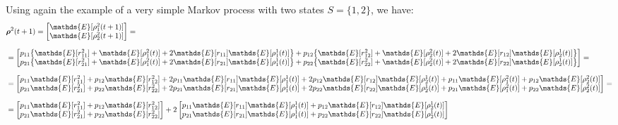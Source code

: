 \documentclass[\main/main.tex]{subfiles}
\begin{document}
Using again the example of a very simple Markov process with two states $S=\{1,2\}$, we have:
\begin{equation}
\setlength{\jot}{10pt}
\begin{split}
    &\bm{\rho}^2(t+1) =    
\begin{bmatrix}
      \mathds{E}[\rho_1^2(t+1)]\\
      \mathds{E}[\rho_2^2(t+1)]\\
\end{bmatrix}= \\
  &= 
 \begin{bmatrix} 
 p_{11} \big\{ \mathds{E}[r^2_{11}]  + \mathds{E}[\rho_1^2(t)] + 2\mathds{E}[r_{11}]\mathds{E}[\rho_1^1(t)]  \big\} + 
 p_{12}\big\{ \mathds{E}[r^2_{12}]  + \mathds{E}[\rho_2^2(t)]+ 2\mathds{E}[r_{12}]\mathds{E}[\rho_2^1(t)] \big\} \\
  p_{21} \big\{ \mathds{E}[r^2_{21}]  + \mathds{E}[\rho_1^2(t)] + 2\mathds{E}[r_{21}]\mathds{E}[\rho_1^1(t)] \big\} +
  p_{22}\big\{ \mathds{E}[r^2_{22}]  + \mathds{E}[\rho_2^2(t)]+ 2\mathds{E}[r_{22}]\mathds{E}[\rho_2^1(t)]  \big\} \\
 \end{bmatrix} =\\
  &=  
 \begin{bmatrix} 
 p_{11}\mathds{E}[r^2_{11}]  +  p_{12}\mathds{E}[r^2_{12}] + 2p_{11}\mathds{E}[r_{11}]\mathds{E}[\rho_1^1(t)] + 2p_{12}\mathds{E}[r_{12}]\mathds{E}[\rho_2^1(t)] +  p_{11}\mathds{E}[\rho_1^2(t)] +  p_{12}\mathds{E}[\rho_2^2(t)]\\
 p_{21}\mathds{E}[r^2_{21}]  +  p_{22}\mathds{E}[r^2_{22}] + 2p_{21}\mathds{E}[r_{21}]\mathds{E}[\rho_1^1(t)] + 2p_{22}\mathds{E}[r_{22}]\mathds{E}[\rho_2^1(t)] +  p_{21}\mathds{E}[\rho_1^2(t)] +  p_{22}\mathds{E}[\rho_2^2(t)]\\
 \end{bmatrix} =\\
  &=  
 \begin{bmatrix} 
 p_{11}\mathds{E}[r^2_{11}]  +  p_{12}\mathds{E}[r^2_{12}]\\
 p_{21}\mathds{E}[r^2_{21}] + p_{22} \mathds{E}[r^2_{22}]\\
 \end{bmatrix}
 + 2
 \begin{bmatrix} 
 p_{11}\mathds{E}[r_{11}] \mathds{E}[\rho_1^1(t)] +  p_{12}\mathds{E}[r_{12}]\mathds{E}[\rho_2^1(t)]\\
 p_{21}\mathds{E}[r_{21}] \mathds{E}[\rho_1^1(t)] +  p_{22}\mathds{E}[r_{22}]\mathds{E}[\rho_2^1(t)]\\

\end{bmatrix}
\end{split}
\end{equation}
\end{document}
